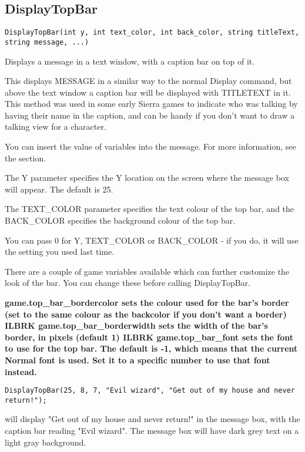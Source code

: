 \subsection{DisplayTopBar}\label{DisplayTopBar}%

\begin{verbatim}
DisplayTopBar(int y, int text_color, int back_color, string titleText, string message, ...)
\end{verbatim}
Displays a message in a text window, with a caption bar on top of it.

This displays MESSAGE in a similar way to the normal Display command, but above the
text window a caption bar will be displayed with TITLETEXT in it. This method was
used in some early Sierra games to indicate who was talking by having their name in
the caption, and can be handy if you don't want to draw a talking view for a character.

You can insert the value of variables into the message. For more information,
see the  section.

The Y parameter specifies the Y location on the screen where the message box will appear.
The default is 25.

The TEXT_COLOR parameter specifies the text colour of the top bar, and the BACK_COLOR specifies
the background colour of the top bar.

You can pass 0 for Y, TEXT_COLOR or BACK_COLOR - if you do, it will use the setting you used
last time.

There are a couple of game variables available which can further customize the look of
the bar. You can change these before calling DisplayTopBar.

\bf{game.top_bar_bordercolor} sets the colour used for the bar's border (set to the same
colour as the backcolor if you don't want a border) ILBRK
\bf{game.top_bar_borderwidth} sets the width of the bar's border, in pixels (default 1) ILBRK
\bf{game.top_bar_font} sets the font to use for the top bar. The default is -1, which means
that the current Normal font is used. Set it to a specific number to use that font instead.

\begin{verbatim}
DisplayTopBar(25, 8, 7, "Evil wizard", "Get out of my house and never return!");
\end{verbatim}
will display "Get out of my house and never return!" in the message box, with the
caption bar reading "Evil wizard". The message box will have dark grey text on a light
gray background.

